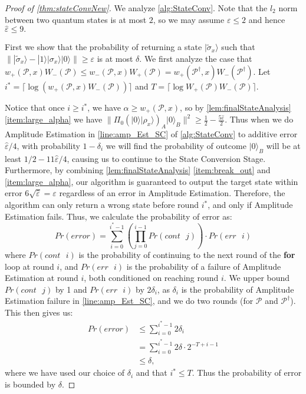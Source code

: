 \documentclass[cleveref, autoref, thm-restate,11pt]{article}
\theoremstyle{definition}
\newcommand{\ket}[1]{|#1\rangle}
\renewcommand{\wp}[2]{{w_+({#1},{#2})}}
\newcommand{\PrCont}[1][i]{Pr(cont\textrm{ }#1)} %
\newcommand{\PrErr}[1][i]{Pr(err\textrm{ }#1)} %
\begin{document}
\begin{proof}[Proof of \cref{thm:stateConvNew}]
We analyze \cref{alg:StateConv}. Note that the $l_2$ norm between two quantum states is at most $2$, so we may assume $\varepsilon\leq 2$ and hence $\hat{\varepsilon}\leq 9.$

First we show that the probability of returning a state $\ket{\tilde{\sigma}_x}$ 
such that $\| \ket{\tilde{\sigma}_x} - \ket{1}\ket{\sigma_x}\ket{0} \| \geq \varepsilon$ is at most $\delta$. We first analyze the case that $w_+(\mathscr P,x)W_-(\mathscr P)\leq w_-(\mathscr P,x)W_+(\mathscr P)=w_+(\mathscr P^\dagger,x)W_-(\mathscr P^\dagger)$.
Let $i^* =\lceil \log(w_+(\mathscr P,x)W_-(\mathscr P))\rceil$ 
and $T = \lceil\log W_+(\mathscr P)W_-(\mathscr P)\rceil$. 



Notice that once $i\geq i^*$, we have $\alpha\geq \wp{\mathscr P}{x}$, so by 
\cref{lem:finalStateAnalysis} \cref{item:large_alpha} we have
$\|\Pi_0({\ket{0}\ket{\rho_x}})_A\ket{0}_B\|^2\geq \frac{1}{2}-\frac{5\hat{\varepsilon}}{2}$. Thus when we do Amplitude Estimation in \cref{line:amp_Est_SC} of 
\cref{alg:StateConv} to additive error $\hat{\varepsilon}/4$, with probability $1-\delta_{i}$ we will find the probability of outcome $\ket{0}_B$ will be at least
$1/2-11\hat{\varepsilon}/4$, causing us to continue to the State Conversion Stage.
Furthermore, by combining \cref{lem:finalStateAnalysis} \cref{item:break_out} and \cref{item:large_alpha}, 
our algorithm is guaranteed to output the target state within error $6\sqrt{\hat{\varepsilon}}=\varepsilon$
regardless of an error in Amplitude Estimation. Therefore, the algorithm can only return a wrong state before
round $i^*$, and only if Amplitude Estimation fails. 
Thus, we calculate the probability of error as:
\begin{equation}
    Pr(error) = \sum_{i=0}^{i^*-1} \left( \prod_{j=0}^{i-1} \PrCont[j] \right) \cdot \PrErr
\end{equation}
where $\PrCont$ is the
probability of continuing to the next round of the \textbf{for} loop at round
$i$,
and $\PrErr$ is the probability of a failure of Amplitude Estimation at round $i$, both conditioned on reaching round $i$. We upper bound $\PrCont[j]$ by 1 and $\PrErr$ by $2\delta_i$, as $\delta_i$ is the probability of Amplitude Estimation failure in \cref{line:amp_Est_SC}, and we do two rounds (for $\mathscr P$ and $\mathscr P^\dagger$). This then gives us:
\begin{align}
    Pr(error) 
    &\leq \sum_{i=0}^{i^*-1} 2\delta_i \nonumber\\ 
    &= \sum_{i=0}^{i^*-1} 2\delta\cdot 2^{-T +i-1} \nonumber\\
    &\leq\delta,
\end{align}
where we have used our choice of $\delta_i$ and that $i^*\leq T$. Thus the probability of error is bounded by 
$\delta$. 


\end{proof}
\end{document}
